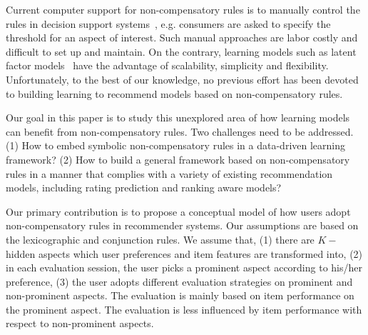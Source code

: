 \documentclass[letterpaper]{article} %
\begin{document}
\begin{table}[htp]
\caption{A cellphone example to illustrate non-compensatory rules.}
\centering
{}
\label{tab:example}
\end{table}
Current computer support for non-compensatory rules is to manually control the rules in decision support systems~\cite{Lee2009Transforming}, e.g. consumers are asked to specify the threshold for an aspect of interest. Such manual approaches are labor costly and difficult to set up and maintain. On the contrary, learning models such as latent factor models~\cite{Koren2009Matrix} have the advantage of scalability, simplicity and flexibility. Unfortunately, to the best of our knowledge, no previous effort has been devoted to building learning to recommend models based on non-compensatory rules. 

Our goal in this paper is to study this unexplored area of how learning models can benefit from non-compensatory rules. Two challenges need to be addressed. (1) How to embed symbolic non-compensatory rules in a data-driven learning framework? (2) How to build a general framework based on non-compensatory rules in a manner that complies with a variety of existing recommendation models, including rating prediction and ranking aware models?  

Our primary contribution is to propose a conceptual model of how users adopt non-compensatory rules in recommender systems. Our assumptions are based on the lexicographic and conjunction rules. We assume that, (1) there are $K-$ hidden aspects which  user preferences and item features are transformed into, (2) in each evaluation session, the user picks a prominent aspect according to his/her preference, (3) the user adopts different evaluation strategies on prominent and non-prominent aspects. The evaluation is mainly based on item performance on the prominent aspect. The evaluation is less influenced by item performance with respect to non-prominent aspects.
\end{document}
